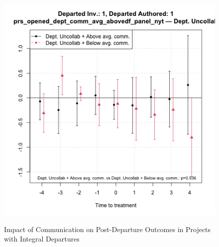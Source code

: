 \begin{figure}[htbp]
\begin{minipage}[b]{0.32\textwidth}
    \label{fig:prs_opened_comm_uncollab_per_int}
    \end{minipage}
    \hfill
        \begin{minipage}[b]{0.32\textwidth}
        \centering
        \includegraphics[width=\textwidth]{temp/output/collab_imp/auth1_inv1_cs_norm_prs_opened_dept_comm_avg_above_Dept.Uncollab.png}
    \label{fig:prs_opened_comm_uncollab_comm_int}
    \end{minipage}
    \caption{Impact of Communication on Post-Departure Outcomes in Projects with Integral Departures}
    \label{fig:prs_opened_comm}
\end{figure}

